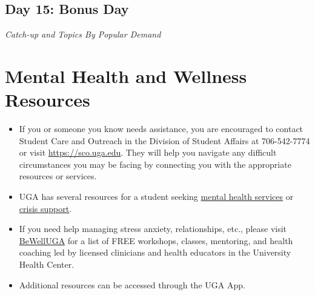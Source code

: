 \documentclass[11pt, letterpaper]{article}
\begin{document}
\subsection*{Day 15: Bonus Day}

\textit{Catch-up and Topics By Popular Demand}

%

\section*{Mental Health and Wellness Resources}

\begin{itemize}
\item If you or someone you know needs assistance, you are encouraged to contact Student Care and Outreach in the Division of Student Affairs at 706-542-7774 or visit \href{https://sco.uga.edu}{https://sco.uga.edu}. They will help you navigate any difficult circumstances you may be facing by connecting you with the appropriate resources or services. 
\item UGA has several resources for a student seeking \href{https://www.uhs.uga.edu/bewelluga/bewelluga}{mental health services} or \href{https://www.uhs.uga.edu/info/emergencies}{crisis support}. 
\item If you need help managing stress anxiety, relationships, etc., please visit \href{https://www.uhs.uga.edu/bewelluga/bewelluga}{BeWellUGA} for a list of FREE workshops, classes, mentoring, and health coaching led by licensed clinicians and health educators in the University Health Center.
\item Additional resources can be accessed through the UGA App.
\end{itemize}



\end{document}
